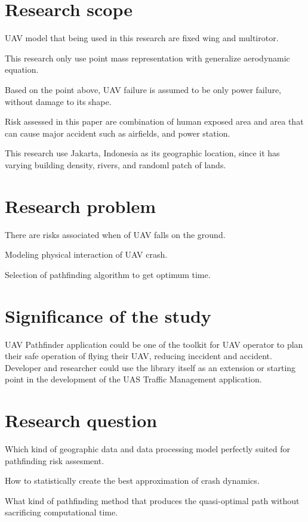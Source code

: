 \documentclass[12pt]{report}
\begin{document}
    \section{Research scope}
        \begin{myitemize}   
            \item UAV model that being used in this research are fixed wing and multirotor.
            \item This research only use point mass representation with generalize aerodynamic equation.
            \item Based on the point above, UAV failure is assumed to be only power failure, without damage to its shape.
            \item Risk assessed in this paper are combination of human exposed area and area that can cause major accident such as airfields, and power station.
            \item This research use Jakarta, Indonesia as its geographic location, since it has varying building density, rivers, and randoml patch of lands.
        \end{myitemize}
        
    \section{Research problem}
        \begin{myitemize}
            \item There are risks associated when of UAV falls on the ground.
            \item Modeling physical interaction of UAV crash.
            \item Selection of pathfinding algorithm to get optimum time.
        \end{myitemize}
        
    \section{Significance of the study}
        UAV Pathfinder application could be one of the toolkit for UAV operator to plan their safe operation of
        flying their UAV, reducing inccident and accident. Developer and researcher could use the library itself as an
        extension or starting point in the development of the \ac{UAS} Traffic Management application.
        
    \section{Research question}
        \begin{myitemize}
            \item Which kind of geographic data and data processing model perfectly suited for pathfinding risk assesment.  
            \item How to statistically create the best approximation of crash dynamics.
            \item What kind of pathfinding method that produces the quasi-optimal path without sacrificing computational time.
        \end{myitemize}
\end{document}
